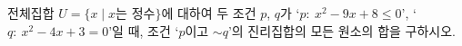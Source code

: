 전체집합 $U=\{x \mid x$는 정수$\}$에 대하여 두 조건 $p$, $q$가 `$p:\ x^2-9x+8\le 0$', `$q:\ x^2-4x+3=0$'일 때, 조건 `$p$이고 $\sim q$'의 진리집합의 모든 원소의 합을 구하시오.
